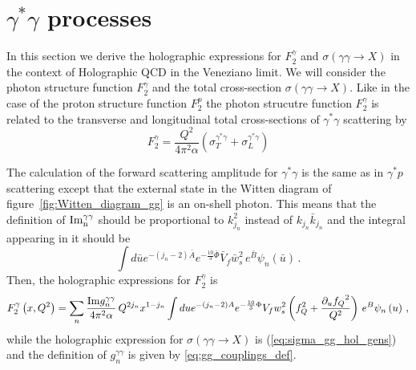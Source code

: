 \documentclass[a4paper,12pt]{article}
\begin{document}
\section{$\gamma^{*} \gamma$ processes}

In this section we derive the holographic expressions for $F_2^\gamma$ and $\sigma\left(\gamma \gamma \rightarrow X\right)$ in the context of Holographic QCD in the Veneziano limit. We will consider the photon structure function $F^{\gamma}_2$ and the total cross-section $\sigma\left(\gamma \gamma \to X\right)$. Like in the case of the proton structure function $F_2^p$ the photon strucutre function $F_2^\gamma$ is related to the transverse and longitudinal total cross-sections of $\gamma^{*}\gamma$ scattering by
\begin{equation}
F_2^\gamma = \frac{Q^2}{4 \pi^2 \alpha} \left( \sigma_T^{\gamma^* \gamma} + \sigma_L^{\gamma^* \gamma} \right)
\end{equation}

The calculation of the forward scattering amplitude for $\gamma^{*}\gamma$ is the same as in $\gamma^{*} p$ scattering except that the external state in the Witten diagram of figure~\ref{fig:Witten_diagram_gg} is an on-shell photon. This means that the definition of $\rm{Im}^{\gamma \gamma}_n$ should be proportional to $k^2_{j_n}$ instead of $k_{j_n}\bar{k}_{j_n}$ and the integral appearing in it should be
\begin{equation}
\int d\bar{u} e^{-\left(j_n - 2 \right) \bar{A} } e^{-\frac{10}{3} \bar{\Phi} } \bar{V}_{f}  \bar{w}_s^2  \, e^{\bar{B}} \psi_n\left(\bar{u}\right) \, .
\end{equation}
Then, the holographic expressions for $F_2^\gamma$ is
\begin{align}
&F^{\gamma}_2\left(x, Q^2\right) = \sum_n \frac{{\rm Im} g^{\gamma \gamma}_n}{4 \pi^2 \alpha} \, Q^{2 j_n} x^{1-j_n}  \int du e^{-\left(j_n - 2 \right)A } e^{-\frac{10}{3} \Phi} V_f w_s^2  \left(f_Q^2 +\frac{\partial_u{f_Q}^2}{Q^2} \right) \, e^B \psi_n\left(u\right) \, \label{eq:hol_f2_gamma} , \\
\end{align}
while the holographic expression for $\sigma\left(\gamma \gamma \to X\right)$ is (\ref{eq:sigma_gg_hol_gens}) and the definition of $g^{\gamma \gamma}_n$ is given by \ref{eq:gg_couplings_def}.
\end{document}
